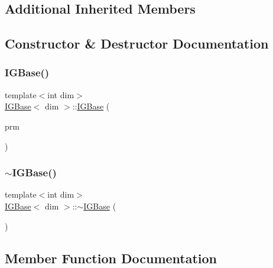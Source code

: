 \subsection*{Additional Inherited Members}


\subsection{Constructor \& Destructor Documentation}
\mbox{\label{class_i_g_base_a50fb50b4a31894ddf7957f5bed6d74e7}} 
\subsubsection{\texorpdfstring{I\+G\+Base()}{IGBase()}}
{\footnotesize\ttfamily template$<$int dim$>$ \\
\hyperlink{class_i_g_base}{I\+G\+Base}$<$ dim $>$\+::\hyperlink{class_i_g_base}{I\+G\+Base} (\begin{DoxyParamCaption}\item[{const Parameter\+Handler \&}]{prm }\end{DoxyParamCaption})}

\mbox{\label{class_i_g_base_abde968ae9031dd55de0193896a0134b9}} 
\subsubsection{\texorpdfstring{$\sim$\+I\+G\+Base()}{~IGBase()}}
{\footnotesize\ttfamily template$<$int dim$>$ \\
\hyperlink{class_i_g_base}{I\+G\+Base}$<$ dim $>$\+::$\sim$\hyperlink{class_i_g_base}{I\+G\+Base} (\begin{DoxyParamCaption}{ }\end{DoxyParamCaption})\hspace{0.3cm}{\ttfamily [virtual]}}



\subsection{Member Function Documentation}
\mbox{\label{class_i_g_base_abd1edeb3ca2076fcb087abc658a09f30}} 
